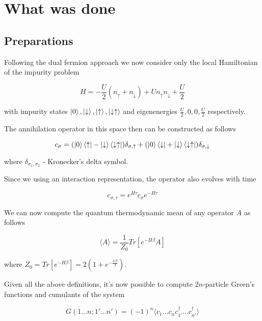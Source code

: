 \section{What was done}
\subsection{Preparations}
Following the dual fermion approach we now consider only the local Hamiltonian of the impurity problem

\begin{equation} H = -\frac{U}{2} \left(n_{\uparrow}+n_{\downarrow}\right) + U n_{\uparrow} n_{\downarrow} + \frac{U}{2} \end{equation}

with impurity states $\ket{0},\ket{\downarrow},\ket{\uparrow},\ket{\downarrow\uparrow}$ and eigenenergies $\frac{U}{2},0,0,\frac{U}{2}$ respectively.

The annihilation operator in this space then can be constructed as follows

\begin{equation} c_\sigma =  	(\ket{0}\bra{\uparrow}-\ket{\downarrow}\bra{\downarrow\uparrow})\delta_{\sigma,\uparrow}
	+	(\ket{0}\bra{\downarrow}+\ket{\downarrow}\bra{\downarrow\uparrow})\delta_{\sigma,\downarrow} \end{equation}

where $\delta_{\sigma_1,\sigma_2}$ - Kronecker's delta symbol.

Since we using an interaction representation, the operator also evolves with time

\begin{equation} c_{\sigma,\tau} = e^{H\tau}c_\sigma e^{-H\tau} \end{equation}

We can now compute the quantum thermodynamic mean of any operator $A$ as follows

\begin{equation} \langle A\rangle = \frac{1}{Z_0}Tr[e^{-H\beta}A] \end{equation}

where $Z_0 = Tr[e^{-H\beta}] = 2(1+e^{-\frac{U\beta}{2}})$.

Given all the above definitions, it's now possible to compute $2n$-particle Green's functions and cumulants of the system

\begin{equation} G(1\dots n;1'\dots n') = (-1)^n \langle c_1\dots c_n c_{1'}^\dagger\dots c_{n'}^\dagger\rangle\end{equation}

